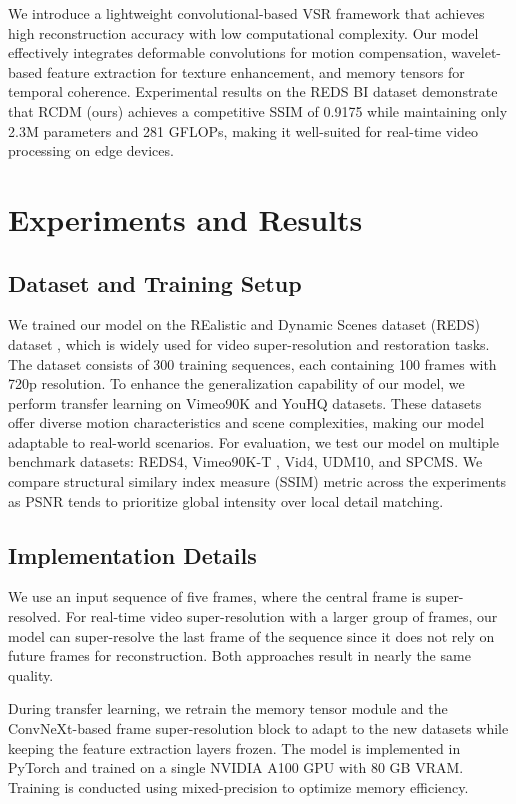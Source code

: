 \documentclass[11pt]{article}
\begin{document}
We introduce a lightweight convolutional-based VSR framework that achieves high reconstruction accuracy with low computational complexity. Our model effectively integrates deformable convolutions for motion compensation, wavelet-based feature extraction for texture enhancement, and memory tensors for temporal coherence. Experimental results on the REDS BI dataset demonstrate that RCDM (ours) achieves a competitive SSIM of 0.9175 while maintaining only 2.3M parameters and 281 GFLOPs, making it well-suited for real-time video processing on edge devices.

\section{Experiments and Results}
\label{sec:experiments}

\subsection{Dataset and Training Setup}
We trained our model on the REalistic and Dynamic Scenes dataset (REDS) dataset \cite{nah2019ntire}, which is widely used for video super-resolution and restoration tasks. The dataset consists of 300 training sequences, each containing 100 frames with 720p resolution. To enhance the generalization capability of our model, we perform transfer learning on Vimeo90K \cite{xue2019video} and YouHQ datasets. These datasets offer diverse motion characteristics and scene complexities, making our model adaptable to real-world scenarios. For evaluation, we test our model on multiple benchmark datasets: REDS4\cite{nah2019ntire}, Vimeo90K-T \cite{xue2019video}, Vid4\cite{liu2013bayesian}, UDM10\cite{yi2019udm10}, and SPCMS\cite{tao2017spmc}. We compare structural similary index measure (SSIM) metric across the experiments as PSNR tends to prioritize global intensity over local detail matching.

\subsection{Implementation Details}
We use an input sequence of five frames, where the central frame is super-resolved. For real-time video super-resolution with a larger group of frames, our model can super-resolve the last frame of the sequence since it does not rely on future frames for reconstruction. Both approaches result in nearly the same quality.

During transfer learning, we retrain the memory tensor module and the ConvNeXt-based frame super-resolution block to adapt to the new datasets while keeping the feature extraction layers frozen. The model is implemented in PyTorch and trained on a single NVIDIA A100 GPU with 80 GB VRAM. Training is conducted using mixed-precision to optimize memory efficiency.
\end{document}
